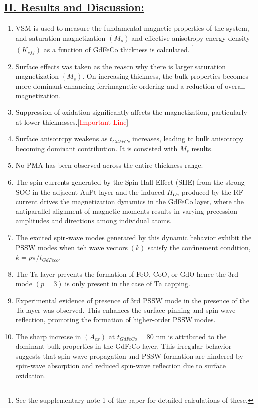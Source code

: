 \subsection*{\underline{II. Results and Discussion:}}
\begin{enumerate}[1.]
    \item VSM is used to measure the fundamental magnetic properties of the system, and saturation magnetization $(M_s)$ and effective anisotropy energy density $(K_{eff})$ as a function of GdFeCo thickness is calculated. \footnote{See the supplementary note 1 of the paper for detailed calculations of these.}
    \item Surface effects was taken as the reason why there is larger saturation magnetization $(M_s)$. On increasing thickness, the bulk properties becomes more dominant enhancing ferrimagnetic ordering and a reduction of overall magnetization.
    \item Suppression of oxidation significantly affects the magnetization, particularly at lower thicknesses.[\textcolor{red}{Important Line}]
    \item Surface anisotropy weakens as $t_{GdFeCo}$ increases, leading to bulk anisotropy becoming dominant contribution. It is consisted with $M_s$ results.
    \item No PMA has been observed across the entire thickness range.
    \item The spin currents generated by the Spin Hall Effect (SHE) from the strong SOC in the adjacent AuPt layer and the induced $H_{Oe}$ produced by the RF current drives the magnetization dynamics in the GdFeCo layer, where the antiparallel alignment of magnetic moments results in varying precession amplitudes and directions among individual atoms.
    \item The excited spin-wave modes generated by this dynamic behavior exhibit the PSSW modes when teh wave vectors $(k)$ satisfy the confinement condition, $k=p\pi/t_{GdFeco}$.
    \item The Ta layer prevents the formation of FeO, CoO, or GdO hence the 3rd mode $(p=3)$ is only present in the case of Ta capping.
    \item Experimental evidence of presence of 3rd PSSW mode in the presence of the Ta layer was observed. This enhances the surface pinning and spin-wave reflection, promoting the formation of higher-order PSSW modes.
    \item The sharp increase in $(A_{ex})$ at $t_{GdFeCo}=80$ nm is attributed to the dominant bulk properties in the GdFeCo layer. This irregular behavior suggests that spin-wave propagation and PSSW formation are hindered by spin-wave absorption and reduced spin-wave reflection due to surface oxidation.

\end{enumerate}
